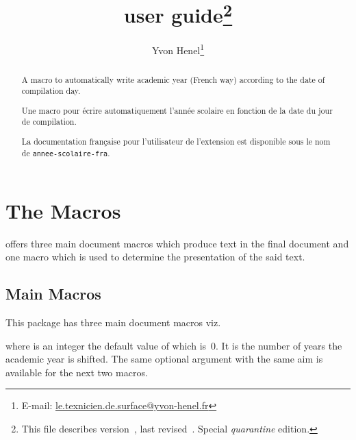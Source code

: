 \documentclass[full]{l3doc}
\begin{document}
\title{ user guide\thanks{This file describes
    version~\ExplFileVersion, last revised~\ExplFileDate. Special
    \emph{quarantine} edition.}}
\author{Yvon Henel\thanks{E-mail:
    \href{mailto:le.texnicien.de.surface@yvon-henel.fr}
    {le.texnicien.de.surface@yvon-henel.fr}}}
\maketitle
\noindent\hrulefill

\begin{abstract}
A macro  to automatically write academic year (French way)
according to the date of compilation day.
\end{abstract}

\noindent\hrulefill

 \begin{otherlanguage}{french}
\begin{abstract}
Une macro  pour écrire automatiquement l'année scolaire en
fonction de la date du jour de compilation.

La documentation française pour l'utilisateur de l'extension
 est disponible sous le nom de \texttt{annee-scolaire-fra}.
\end{abstract}
\end{otherlanguage}

\noindent\hrulefill
\vspace{\baselineskip}

\section{The Macros}
\label{sec:macros}

 offers three main document macros which produce
text in the final document and one macro which is used to determine the
presentation of the said text.

\subsection{Main Macros}
\label{sec:main}

This package has three main document macros viz.
\begin{function}{\anneescolaire}
  \begin{syntax}
  \end{syntax}
  where  is an integer the default value of which is~\(0\). It is
  the number of years the academic year is shifted. The same optional argument
  with the same aim is available for the next two macros.
\end{function}
\end{document}

